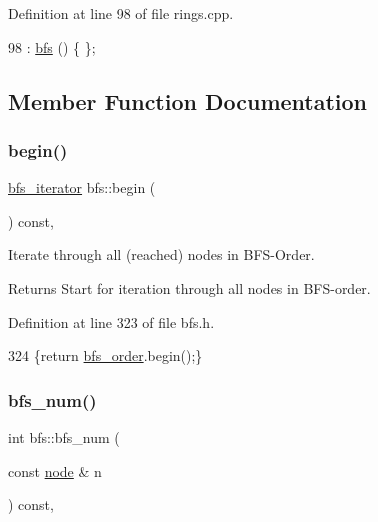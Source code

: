 Definition at line 98 of file rings.\+cpp.


\begin{DoxyCode}
98 : \mbox{\hyperlink{classbfs_a21bcb84fc2db7cf5e789c0459e11c501}{bfs}} () \{  \};
\end{DoxyCode}


\subsection{Member Function Documentation}
\mbox{\label{classbfs_aff214e6d33f7f2bbd899cf335540def9}} 
\subsubsection{\texorpdfstring{begin()}{begin()}}
{\footnotesize\ttfamily \mbox{\hyperlink{classbfs_a1035f068a96de0370789ec315aef4f73}{bfs\+\_\+iterator}} bfs\+::begin (\begin{DoxyParamCaption}{ }\end{DoxyParamCaption}) const\hspace{0.3cm}{\ttfamily [inline]}, {\ttfamily [inherited]}}



Iterate through all (reached) nodes in B\+F\+S-\/\+Order. 

\begin{DoxyReturn}{Returns}
Start for iteration through all nodes in B\+F\+S-\/order. 
\end{DoxyReturn}


Definition at line 323 of file bfs.\+h.


\begin{DoxyCode}
324     \{\textcolor{keywordflow}{return} \mbox{\hyperlink{classbfs_a2596d2cf52f6e7922fd94ce1adde760e}{bfs\_order}}.begin();\}
\end{DoxyCode}
\mbox{\label{classbfs_a6205cc191bc0bedf1ff9d74af0925735}} 
\subsubsection{\texorpdfstring{bfs\+\_\+num()}{bfs\_num()}}
{\footnotesize\ttfamily int bfs\+::bfs\+\_\+num (\begin{DoxyParamCaption}\item[{const \mbox{\hyperlink{classnode}{node}} \&}]{n }\end{DoxyParamCaption}) const\hspace{0.3cm}{\ttfamily [inline]}, {\ttfamily [inherited]}}



